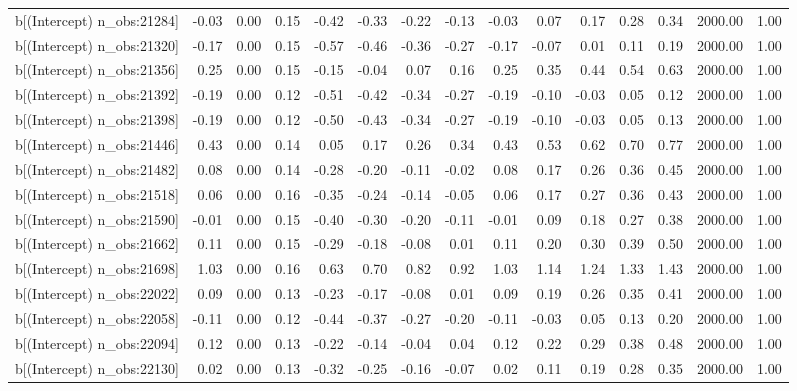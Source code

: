 \begin{table}[ht]
\begin{tabular}{rrrrrrrrrrrrrrr}
  b[(Intercept) n\_obs:21284] & -0.03 & 0.00 & 0.15 & -0.42 & -0.33 & -0.22 & -0.13 & -0.03 & 0.07 & 0.17 & 0.28 & 0.34 & 2000.00 & 1.00 \\ 
  b[(Intercept) n\_obs:21320] & -0.17 & 0.00 & 0.15 & -0.57 & -0.46 & -0.36 & -0.27 & -0.17 & -0.07 & 0.01 & 0.11 & 0.19 & 2000.00 & 1.00 \\ 
  b[(Intercept) n\_obs:21356] & 0.25 & 0.00 & 0.15 & -0.15 & -0.04 & 0.07 & 0.16 & 0.25 & 0.35 & 0.44 & 0.54 & 0.63 & 2000.00 & 1.00 \\ 
  b[(Intercept) n\_obs:21392] & -0.19 & 0.00 & 0.12 & -0.51 & -0.42 & -0.34 & -0.27 & -0.19 & -0.10 & -0.03 & 0.05 & 0.12 & 2000.00 & 1.00 \\ 
  b[(Intercept) n\_obs:21398] & -0.19 & 0.00 & 0.12 & -0.50 & -0.43 & -0.34 & -0.27 & -0.19 & -0.10 & -0.03 & 0.05 & 0.13 & 2000.00 & 1.00 \\ 
  b[(Intercept) n\_obs:21446] & 0.43 & 0.00 & 0.14 & 0.05 & 0.17 & 0.26 & 0.34 & 0.43 & 0.53 & 0.62 & 0.70 & 0.77 & 2000.00 & 1.00 \\ 
  b[(Intercept) n\_obs:21482] & 0.08 & 0.00 & 0.14 & -0.28 & -0.20 & -0.11 & -0.02 & 0.08 & 0.17 & 0.26 & 0.36 & 0.45 & 2000.00 & 1.00 \\ 
  b[(Intercept) n\_obs:21518] & 0.06 & 0.00 & 0.16 & -0.35 & -0.24 & -0.14 & -0.05 & 0.06 & 0.17 & 0.27 & 0.36 & 0.43 & 2000.00 & 1.00 \\ 
  b[(Intercept) n\_obs:21590] & -0.01 & 0.00 & 0.15 & -0.40 & -0.30 & -0.20 & -0.11 & -0.01 & 0.09 & 0.18 & 0.27 & 0.38 & 2000.00 & 1.00 \\ 
  b[(Intercept) n\_obs:21662] & 0.11 & 0.00 & 0.15 & -0.29 & -0.18 & -0.08 & 0.01 & 0.11 & 0.20 & 0.30 & 0.39 & 0.50 & 2000.00 & 1.00 \\ 
  b[(Intercept) n\_obs:21698] & 1.03 & 0.00 & 0.16 & 0.63 & 0.70 & 0.82 & 0.92 & 1.03 & 1.14 & 1.24 & 1.33 & 1.43 & 2000.00 & 1.00 \\ 
  b[(Intercept) n\_obs:22022] & 0.09 & 0.00 & 0.13 & -0.23 & -0.17 & -0.08 & 0.01 & 0.09 & 0.19 & 0.26 & 0.35 & 0.41 & 2000.00 & 1.00 \\ 
  b[(Intercept) n\_obs:22058] & -0.11 & 0.00 & 0.12 & -0.44 & -0.37 & -0.27 & -0.20 & -0.11 & -0.03 & 0.05 & 0.13 & 0.20 & 2000.00 & 1.00 \\ 
  b[(Intercept) n\_obs:22094] & 0.12 & 0.00 & 0.13 & -0.22 & -0.14 & -0.04 & 0.04 & 0.12 & 0.22 & 0.29 & 0.38 & 0.48 & 2000.00 & 1.00 \\ 
  b[(Intercept) n\_obs:22130] & 0.02 & 0.00 & 0.13 & -0.32 & -0.25 & -0.16 & -0.07 & 0.02 & 0.11 & 0.19 & 0.28 & 0.35 & 2000.00 & 1.00 \\ 

\end{tabular}
\end{table}
